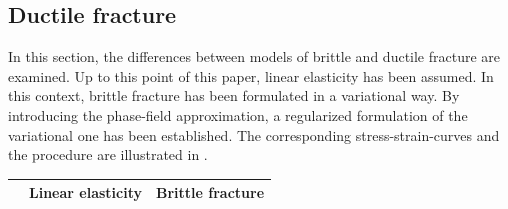 \subsection{Ductile fracture} \label{sec:ductile_frac}
In this section, the differences between models of brittle and ductile fracture are examined. Up to this point of this paper, linear elasticity has been assumed. In this context, brittle fracture has been formulated in a variational way. By introducing the phase-field approximation, a regularized formulation of the variational one has been established. The corresponding stress-strain-curves and the procedure are illustrated in .
\begin{table}[!ht]
	\begin{center}
	\begin{tabular}{|c||c|c|c|}
		\cline{2-4}
			\multicolumn{1}{c||}{}& Linear elasticity & \multicolumn{2}{c|}{Brittle fracture} \\
 		\hline\hline

\end{tabular}
\end{center}
\end{table}

